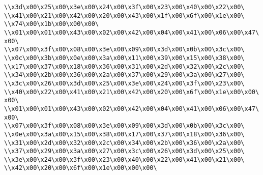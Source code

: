 \verb|\\x3d\x00\x25\x00\x3e\x00\x24\x00\x3f\x00\x23\x00\x40\x00\x22\x00\|\newline
\verb|\\x41\x00\x21\x00\x42\x00\x20\x00\x43\x00\x1f\x00\x6f\x00\x1e\x00\|\newline
\verb|\\x74\x00\x1b\x00\x00\x00\|\newline
\verb|\\x01\x00\x01\x00\x43\x00\x02\x00\x42\x00\x04\x00\x41\x00\x06\x00\x47\x00\|\newline
\verb|\\x07\x00\x3f\x00\x08\x00\x3e\x00\x09\x00\x3d\x00\x0b\x00\x3c\x00\|\newline
\verb|\\x0c\x00\x3b\x00\x0e\x00\x3a\x00\x11\x00\x39\x00\x15\x00\x38\x00\|\newline
\verb|\\x17\x00\x37\x00\x18\x00\x36\x00\x31\x00\x2d\x00\x32\x00\x2c\x00\|\newline
\verb|\\x34\x00\x2b\x00\x36\x00\x2a\x00\x37\x00\x29\x00\x3a\x00\x27\x00\|\newline
\verb|\\x3c\x00\x26\x00\x3d\x00\x25\x00\x3e\x00\x24\x00\x3f\x00\x23\x00\|\newline
\verb|\\x40\x00\x22\x00\x41\x00\x21\x00\x42\x00\x20\x00\x6f\x00\x1e\x00\x00\x00\|\newline
\verb|\\x01\x00\x01\x00\x43\x00\x02\x00\x42\x00\x04\x00\x41\x00\x06\x00\x47\x00\|\newline
\verb|\\x07\x00\x3f\x00\x08\x00\x3e\x00\x09\x00\x3d\x00\x0b\x00\x3c\x00\|\newline
\verb|\\x0e\x00\x3a\x00\x15\x00\x38\x00\x17\x00\x37\x00\x18\x00\x36\x00\|\newline
\verb|\\x31\x00\x2d\x00\x32\x00\x2c\x00\x34\x00\x2b\x00\x36\x00\x2a\x00\|\newline
\verb|\\x37\x00\x29\x00\x3a\x00\x27\x00\x3c\x00\x26\x00\x3d\x00\x25\x00\|\newline
\verb|\\x3e\x00\x24\x00\x3f\x00\x23\x00\x40\x00\x22\x00\x41\x00\x21\x00\|\newline
\verb|\\x42\x00\x20\x00\x6f\x00\x1e\x00\x00\x00\|\newline
